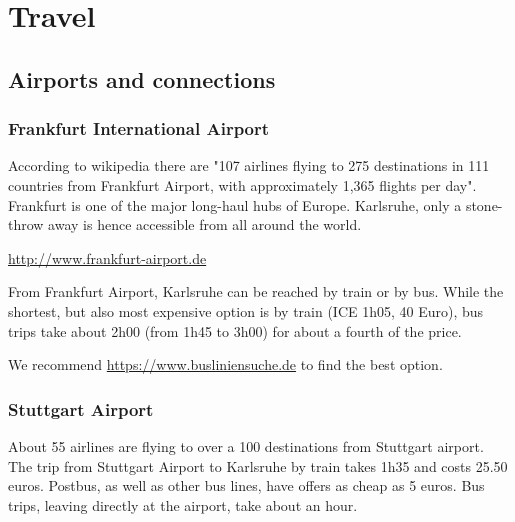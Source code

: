 \section{Travel}

\subsection{Airports and connections}

\subsubsection{Frankfurt International Airport}

According to wikipedia there are "107 airlines flying to 275 destinations in 111 countries from Frankfurt Airport, with approximately 1,365 flights per day". Frankfurt is one of the major long-haul hubs of Europe. Karlsruhe, only a stone-throw away is hence accessible from all around the world.

\url{http://www.frankfurt-airport.de}

From Frankfurt Airport, Karlsruhe can be reached by train or by bus. While the shortest, but also most expensive option is by train (ICE 1h05, 40 Euro), bus trips take about 2h00 (from 1h45 to 3h00) for about a fourth of the price.

We recommend \url{https://www.busliniensuche.de} to find the best option.

\iffalse
\subsubsection{Frankfurt Hahn}

Various airlines are connecting Frankfurt Hahn to about 30 destinations in Europe. Most of these airlines offer fairly cheap fares (Ryanair, Easyjet etc.). The airport is only accessible from Karlsruhe by bus over Mannheim or Frankfurt. The trip takes about 4 hours and costs roughly 25 euros.

\url{https://www.hahn-airport.de}
\fi

\subsubsection{Stuttgart Airport}

About 55 airlines are flying to over a 100 destinations from Stuttgart airport. The trip from Stuttgart Airport to Karlsruhe by train takes 1h35 and costs 25.50 euros. Postbus, as well as other bus lines, have offers as cheap as 5 euros. Bus trips, leaving directly at the airport, take about an hour. 

